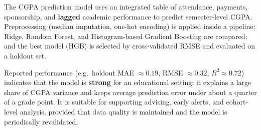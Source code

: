 \documentclass[12pt,a4paper]{article}
\begin{document}
The CGPA prediction model uses an integrated table of attendance, payments, sponsorship, and \textbf{lagged} academic performance to predict semester-level CGPA. Preprocessing (median imputation, one-hot encoding) is applied inside a pipeline; Ridge, Random Forest, and Histogram-based Gradient Boosting are compared; and the best model (HGB) is selected by cross-validated RMSE and evaluated on a holdout set.

Reported performance (e.g.\ holdout MAE \(\approx 0.19\), RMSE \(\approx 0.32\), \(R^2 \approx 0.72\)) indicates that the model is \textbf{strong} for an educational setting: it explains a large share of CGPA variance and keeps average prediction error under about a quarter of a grade point. It is suitable for supporting advising, early alerts, and cohort-level analysis, provided that data quality is maintained and the model is periodically revalidated.
\end{document}
